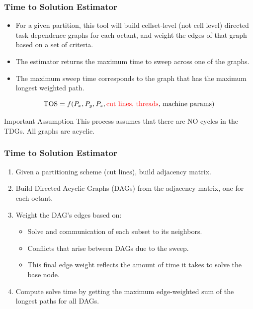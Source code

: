 \documentclass[xcolor={usenames,dvipsnames,svgnames,table}]{beamer}
\begin{document}
\begin{frame}[t]\frametitle{Time to Solution Estimator}
\begin{block}{}
\begin{itemize}
  \item For a given partition, this tool will build cellset-level (not cell level) directed task dependence graphs for each octant, and weight the edges of that graph based on a set of criteria.
  \item The estimator returns the maximum time to sweep across one of the graphs.
  \item The maximum sweep time corresponds to the graph that has the maximum longest weighted path. 
\end{itemize}
\end{block}
\begin{block}{}
\begin{equation}
\text{TOS} = f(P_x, P_y, P_z, \text{\textcolor{red}{cut lines, threads}, machine params})
\end{equation}
\end{block}
\begin{block}{Important Assumption}
This process assumes that there are NO cycles in the TDGs. All graphs are acyclic.
\end{block}
\end{frame}

\begin{frame}[t]\frametitle{Time to Solution Estimator}
\begin{block}{}
\begin{enumerate}
	\item Given a partitioning scheme (cut lines), build adjacency matrix.
	\item Build Directed Acyclic Graphs (DAGs) from the adjacency matrix, one for each octant.
	\item Weight the DAG's edges based on:
	\begin{itemize}
		\item Solve and communication of each subset to its neighbors.
		\item Conflicts that arise between DAGs due to the sweep.
		\item This final edge weight reflects the amount of time it takes to solve the base node.
	\end{itemize}
	\item Compute solve time by getting the maximum edge-weighted sum of the longest paths for all DAGs.
\end{enumerate}
\end{block}
\end{frame}
\end{document}
